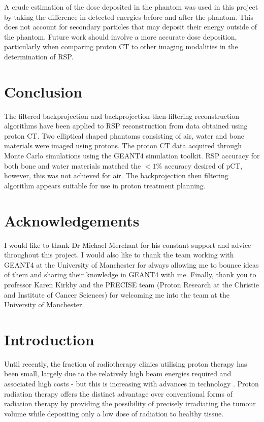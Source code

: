 \documentclass[11pt,a4paper]{article}
\begin{document}
A crude estimation of the dose deposited in the phantom was used in this project by taking the difference in detected energies before and after the phantom. This does not account for secondary particles that may deposit their energy outside of the phantom. Future work should involve a more accurate dose deposition, particularly when comparing proton CT to other imaging modalities in the determination of RSP.

\section{Conclusion}
The filtered backprojection and backprojection-then-filtering reconstruction algorithms have been applied to RSP reconstruction from data obtained using proton CT. Two elliptical shaped phantoms consisting of air, water and bone materials were imaged using protons. The proton CT data acquired through Monte Carlo simulations using the GEANT4 simulation toolkit. RSP accuracy for both bone and water materials matched the $< 1$\% accuracy desired of pCT, however, this was not achieved for air. The backprojection then filtering algorithm appears suitable for use in proton treatment planning. 

\section{Acknowledgements}
I would like to thank Dr Michael Merchant for his constant support and advice throughout this project. I would also like to thank the team working with GEANT4 at the University of Manchester for always allowing me to bounce ideas of them and sharing their knowledge in GEANT4 with me. Finally, thank you to professor Karen Kirkby and the PRECISE team (Proton Research at the Christie and Institute of Cancer Sciences) for welcoming me into the team at the University of Manchester.


\newpage
\appendix 
\section{Introduction}
\label{app:intro}
Until recently, the fraction of radiotherapy clinics utilising proton therapy has been small, largely due to the relatively high beam energies required and associated high costs - but this is increasing with advances in technology \cite{schulte2004conceptual}. Proton radiation therapy offers the distinct advantage over conventional forms of radiation therapy by providing the possibility of precisely irradiating the tumour volume while depositing only a low dose of radiation to healthy tissue. 
\end{document}
